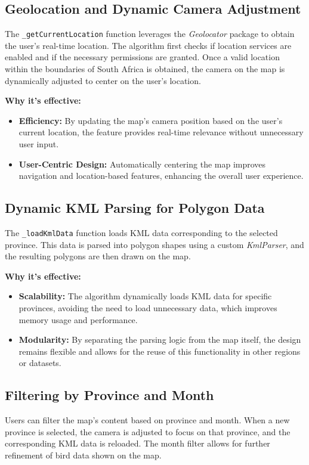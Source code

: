 \documentclass[a4paper]{article}
\begin{document}
\subsection{Geolocation and Dynamic Camera Adjustment}
The \texttt{\_getCurrentLocation} function leverages the \textit{Geolocator} package to obtain the user’s real-time location. The algorithm first checks if location services are enabled and if the necessary permissions are granted. Once a valid location within the boundaries of South Africa is obtained, the camera on the map is dynamically adjusted to center on the user’s location.

\textbf{Why it's effective:}
\begin{itemize}
    \item \textbf{Efficiency:} By updating the map's camera position based on the user’s current location, the feature provides real-time relevance without unnecessary user input.
    \item \textbf{User-Centric Design:} Automatically centering the map improves navigation and location-based features, enhancing the overall user experience.
\end{itemize}

\subsection{Dynamic KML Parsing for Polygon Data}
The \texttt{\_loadKmlData} function loads KML data corresponding to the selected province. This data is parsed into polygon shapes using a custom \textit{KmlParser}, and the resulting polygons are then drawn on the map.

\textbf{Why it's effective:}
\begin{itemize}
    \item \textbf{Scalability:} The algorithm dynamically loads KML data for specific provinces, avoiding the need to load unnecessary data, which improves memory usage and performance.
    \item \textbf{Modularity:} By separating the parsing logic from the map itself, the design remains flexible and allows for the reuse of this functionality in other regions or datasets.
\end{itemize}

\subsection{Filtering by Province and Month}
Users can filter the map’s content based on province and month. When a new province is selected, the camera is adjusted to focus on that province, and the corresponding KML data is reloaded. The month filter allows for further refinement of bird data shown on the map.
\end{document}
